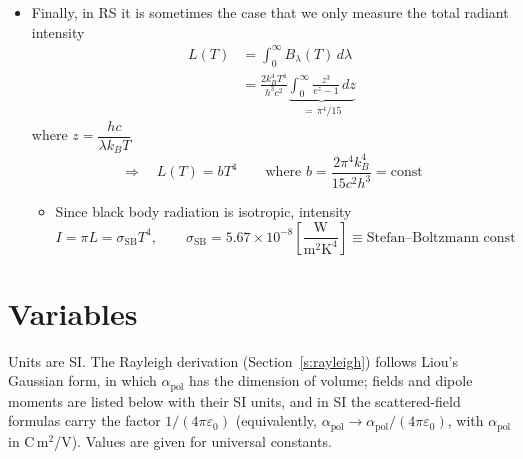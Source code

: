 \documentclass[11pt, oneside]{article}
\begin{document}
\begin{itemize}
	\item Finally, in RS it is sometimes the case that we only measure the total radiant intensity
	\begin{align}
		L(T) &= \int_0^\infty B_\lambda(T)\,d\lambda \nonumber\\
		&= \frac{2k_B^4T^4}{h^3c^2}\underbrace{\int_0^\infty\frac{z^3}{e^z - 1}\,dz}_{=\,\pi^4/15} \label{e:Ltot}
	\end{align}
	where $z = \dfrac{hc}{\lambda k_BT}$
	\begin{equation*}
		\Rightarrow\quad L(T) = bT^4 \qquad \text{where } b = \frac{2\pi^4k_B^4}{15c^2h^3} = \text{const}
	\end{equation*}
	\begin{itemize}
		\item[--] Since black body radiation is isotropic, intensity
		\begin{equation}
			\label{e:SB}
			I = \pi L = \sigma_\mathrm{SB} T^4, \qquad \sigma_\mathrm{SB} = 5.67\times10^{-8}\left[\frac{\text{W}}{\text{m}^2\text{K}^4}\right] \equiv \text{Stefan--Boltzmann const}
		\end{equation}
	\end{itemize}
\end{itemize}

\clearpage
\section*{Variables}

Units are SI. The Rayleigh derivation (Section~\ref{s:rayleigh}) follows Liou's Gaussian form, in which $\alpha_\mathrm{pol}$ has the dimension of volume; fields and dipole moments are listed below with their SI units, and in SI the scattered-field formulas carry the factor $1/(4\pi\varepsilon_0)$ (equivalently, $\alpha_\mathrm{pol} \rightarrow \alpha_\mathrm{pol}/(4\pi\varepsilon_0)$, with $\alpha_\mathrm{pol}$ in C\,m$^2$/V). Values are given for universal constants.
\end{document}
